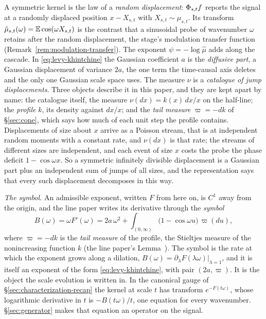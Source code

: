 \begin{remark}\label{rem:displacement-dictionary}
A symmetric kernel is the law of a \emph{random displacement}: $\Phi_{s,t}f$ reports the
signal at a randomly displaced position $x - X_{s,t}$ with $X_{s,t} \sim \mu_{s,t}$. Its
transform $\hat\mu_{s,t}(\omega) = \mathbb{E}\cos(\omega X_{s,t})$ is the contrast that a
sinusoidal probe of wavenumber $\omega$ retains after the random displacement, the stage's
modulation transfer function (Remark~\ref{rem:modulation-transfer}). The exponent
$\psi = -\log\hat\mu$ adds along the cascade. In \ref{eq:levy-khintchine} the Gaussian
coefficient $a$ is the \emph{diffusive part}, a Gaussian displacement of variance $2a$, the
one term the time-causal axis deletes and
the only one Gaussian scale space uses. The measure $\nu$ is a \emph{catalogue of jump
displacements}. Three objects describe it in this paper, and they are kept apart by name: the
catalogue itself, the measure $\nu(dx) = k(x)\,dx/x$ on the half-line; the \emph{profile} $k$,
its density against $dx/x$; and the \emph{tail measure} $\varpi = -dk$ of \S\ref{sec:cone},
which says how much of each unit step the profile contains. Displacements of size about $x$
arrive as a Poisson stream, that is at
independent random moments with a constant rate, and $\nu(dx)$ is that rate; the streams of
different sizes are independent, and each event of size $x$ costs the probe the phase
deficit $1 - \cos\omega x$. So a symmetric infinitely divisible displacement is a Gaussian
part plus an independent sum of jumps of all sizes, and the representation says that every
such displacement decomposes in this way.
\end{remark}

\emph{The symbol.} An admissible exponent, written $F$ from here on, is $C^1$ away from the
origin, and the line paper
writes its derivative through the \emph{symbol}
\begin{equation}\label{eq:symbol}
  B(\omega) = \omega F'(\omega)
   = 2a\,\omega^2 + \int_{(0,\infty)} \bigl(1 - \cos\omega u\bigr)\,\varpi(du),
\end{equation}
where $\varpi = -dk$ is the \emph{tail measure} of the profile, the Stieltjes measure of the
nonincreasing function $k$ (the line paper's Lemma~).
The symbol is the
rate at which the exponent grows along a dilation, $B(\omega) = \partial_\lambda
F(\lambda\omega)|_{\lambda = 1}$, and it is itself an exponent of the form
\ref{eq:levy-khintchine}, with pair $(2a,\varpi)$. It is the object the scale evolution is
written in. In the canonical gauge of \S\ref{sec:characterization-recap} the kernel at scale
$t$ has transform $e^{-F(t\omega)}$, whose logarithmic derivative in $t$ is $-B(t\omega)/t$,
one equation for every wavenumber.
\S\ref{sec:generator} makes that equation an operator on the signal.

